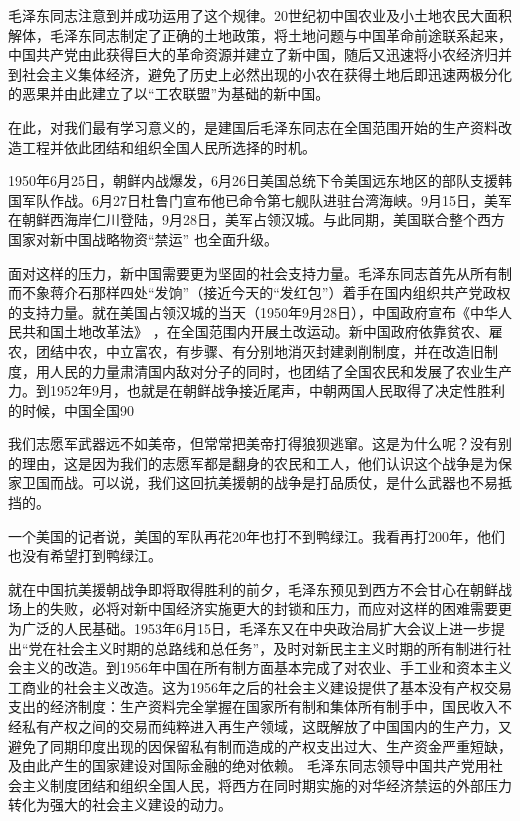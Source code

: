 \documentclass[UTF8, 12pt, a4paper]{ctexrep}
\begin{document}
毛泽东同志注意到并成功运用了这个规律。20世纪初中国农业及小土地农民大面积解体，毛泽东同志制定了正确的土地政策，将土地问题与中国革命前途联系起来，中国共产党由此获得巨大的革命资源并建立了新中国，随后又迅速将小农经济归并到社会主义集体经济，避免了历史上必然出现的小农在获得土地后即迅速两极分化的恶果并由此建立了以“工农联盟”为基础的新中国。

在此，对我们最有学习意义的，是建国后毛泽东同志在全国范围开始的生产资料改造工程并依此团结和组织全国人民所选择的时机。

1950年6月25日，朝鲜内战爆发，6月26日美国总统下令美国远东地区的部队支援韩国军队作战。6月27日杜鲁门宣布他已命令第七舰队进驻台湾海峡。9月15日，美军在朝鲜西海岸仁川登陆，9月28日，美军占领汉城。与此同期，美国联合整个西方国家对新中国战略物资“禁运” 也全面升级。

面对这样的压力，新中国需要更为坚固的社会支持力量。毛泽东同志首先从所有制而不象蒋介石那样四处“发饷”（接近今天的“发红包”）着手在国内组织共产党政权的支持力量。就在美国占领汉城的当天（1950年9月28日），中国政府宣布《中华人民共和国土地改革法》 ，在全国范围内开展土改运动。新中国政府依靠贫农、雇农，团结中农，中立富农，有步骤、有分别地消灭封建剥削制度，并在改造旧制度，用人民的力量肃清国内敌对分子的同时，也团结了全国农民和发展了农业生产力。到1952年9月，也就是在朝鲜战争接近尾声，中朝两国人民取得了决定性胜利的时候，中国全国90%

我们志愿军武器远不如美帝，但常常把美帝打得狼狈逃窜。这是为什么呢？没有别的理由，这是因为我们的志愿军都是翻身的农民和工人，他们认识这个战争是为保家卫国而战。可以说，我们这回抗美援朝的战争是打品质仗，是什么武器也不易抵挡的。

一个美国的记者说，美国的军队再花20年也打不到鸭绿江。我看再打200年，他们也没有希望打到鸭绿江。

就在中国抗美援朝战争即将取得胜利的前夕，毛泽东预见到西方不会甘心在朝鲜战场上的失败，必将对新中国经济实施更大的封锁和压力，而应对这样的困难需要更为广泛的人民基础。1953年6月15日，毛泽东又在中央政治局扩大会议上进一步提出“党在社会主义时期的总路线和总任务”，及时对新民主主义时期的所有制进行社会主义的改造。到1956年中国在所有制方面基本完成了对农业、手工业和资本主义工商业的社会主义改造。这为1956年之后的社会主义建设提供了基本没有产权交易支出的经济制度：生产资料完全掌握在国家所有制和集体所有制手中，国民收入不经私有产权之间的交易而纯粹进入再生产领域，这既解放了中国国内的生产力，又避免了同期印度出现的因保留私有制而造成的产权支出过大、生产资金严重短缺，及由此产生的国家建设对国际金融的绝对依赖。 毛泽东同志领导中国共产党用社会主义制度团结和组织全国人民，将西方在同时期实施的对华经济禁运的外部压力转化为强大的社会主义建设的动力。
\end{document}
